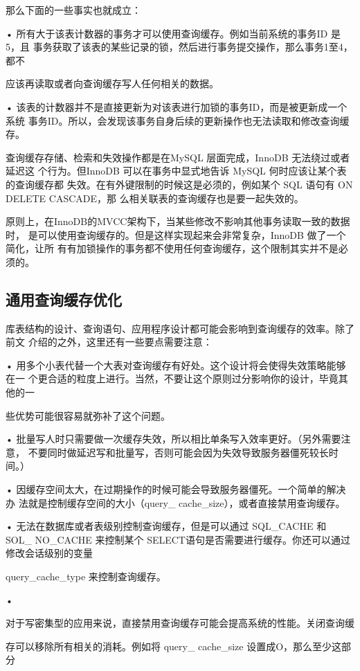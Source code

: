 那么下面的一些事实也就成立：

• 所有大于该表计数器的事务才可以使用查询缓存。例如当前系统的事务ID 是5，且
事务获取了该表的某些记录的锁，然后进行事务提交操作，那么事务1至4，都不

应该再读取或者向查询缓存写人任何相关的数据。

• 该表的计数器并不是直接更新为对该表进行加锁的事务ID，而是被更新成一个系统
事务ID。所以，会发现该事务自身后续的更新操作也无法读取和修改查询缓存。

查询缓存存储、检索和失效操作都是在MySQL 层面完成，InnoDB 无法绕过或者延迟这
个行为。但InnoDB 可以在事务中显式地告诉 MySQL 何时应该让某个表的查询缓存都
失效。在有外键限制的时候这是必须的，例如某个 SQL 语句有 ON DELETE CASCADE，那
么相关联表的查询缓存也是要一起失效的。

原则上，在InnoDB的MVCC架构下，当某些修改不影响其他事务读取一致的数据时，
是可以使用查询缓存的。但是这样实现起来会非常复杂，InnoDB 做了一个简化，让所
有有加锁操作的事务都不使用任何查询缓存，这个限制其实并不是必须的。

\subsection{通用查询缓存优化}
库表结构的设计、查询语句、应用程序设计都可能会影响到查询缓存的效率。除了前文
介绍的之外，这里还有一些要点需要注意：

• 用多个小表代替一个大表对查询缓存有好处。这个设计将会使得失效策略能够在一
个更合适的粒度上进行。当然，不要让这个原则过分影响你的设计，毕竟其他的一

些优势可能很容易就弥补了这个问题。

• 批量写人时只需要做一次缓存失效，所以相比单条写入效率更好。（另外需要注意，
不要同时做延迟写和批量写，否则可能会因为失效导致服务器僵死较长时间。）

• 因缓存空间太大，在过期操作的时候可能会导致服务器僵死。一个简单的解决办
法就是控制缓存空间的大小（query\_ cache\_size），或者直接禁用查询缓存。

• 无法在数据库或者表级别控制查询缓存，但是可以通过 SQL\_CACHE 和 SOL\_ NO\_CACHE
来控制某个 SELECT语句是否需要进行缓存。你还可以通过修改会话级别的变量

query\_cache\_type 来控制查询缓存。

•

对于写密集型的应用来说，直接禁用查询缓存可能会提高系统的性能。关闭查询缓

存可以移除所有相关的消耗。例如将 query\_ cache\_size 设置成O，那么至少这部分

